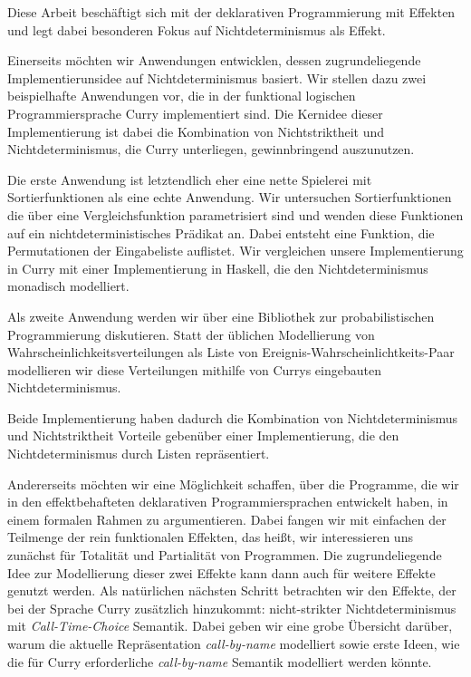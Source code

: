 Diese Arbeit besch\"aftigt sich mit der deklarativen
Programmierung mit Effekten und legt dabei besonderen Fokus auf
Nichtdeterminismus als Effekt.

Einerseits m\"ochten wir Anwendungen entwicklen, dessen
zugrundeliegende Implementierunsidee auf Nichtdeterminismus basiert.
Wir stellen dazu zwei beispielhafte Anwendungen vor, die in der
funktional logischen Programmiersprache Curry implementiert sind.
Die Kernidee dieser Implementierung ist dabei die Kombination von
Nichtstriktheit und Nichtdeterminismus, die Curry unterliegen,
gewinnbringend auszunutzen.

Die erste Anwendung ist letztendlich eher eine nette Spielerei mit
Sortierfunktionen als eine echte Anwendung.
Wir untersuchen Sortierfunktionen die \"uber eine Vergleichsfunktion
parametrisiert sind und wenden diese Funktionen auf ein
nichtdeterministisches Pr\"adikat an.
Dabei entsteht eine Funktion, die Permutationen der Eingabeliste
auflistet.
Wir vergleichen unsere Implementierung in Curry mit einer
Implementierung in Haskell, die den Nichtdeterminismus monadisch
modelliert.

Als zweite Anwendung werden wir \"uber eine Bibliothek zur
probabilistischen Programmierung diskutieren.
Statt der \"ublichen Modellierung von Wahrscheinlichkeitsverteilungen
als Liste von Ereignis-Wahrscheinlichtkeits-Paar modellieren wir diese
Verteilungen mithilfe von Currys eingebauten Nichtdeterminismus.

Beide Implementierung haben dadurch die Kombination von
Nichtdeterminismus und Nichtstriktheit Vorteile geben\"uber
einer Implementierung, die den Nichtdeterminismus durch Listen
repr\"asentiert.

Andererseits m\"ochten wir eine M\"oglichkeit schaffen, \"uber die
Programme, die wir in den effektbehafteten deklarativen
Programmiersprachen entwickelt haben, in einem formalen Rahmen zu
argumentieren.
Dabei fangen wir mit einfachen der Teilmenge der rein funktionalen
Effekten, das hei\ss{}t, wir interessieren uns zun\"achst f\"ur
Totalit\"at und Partialit\"at von Programmen.
Die zugrundeliegende Idee zur Modellierung dieser zwei Effekte kann
dann auch f\"ur weitere Effekte genutzt werden.
Als nat\"urlichen n\"achsten Schritt betrachten wir den Effekte, der
bei der Sprache Curry zus\"atzlich hinzukommt: nicht-strikter
Nichtdeterminismus mit \emph{Call-Time-Choice} Semantik.
Dabei geben wir eine grobe \"Ubersicht dar\"uber, warum die aktuelle
Repr\"asentation \emph{call-by-name} modelliert sowie erste Ideen, wie
die f\"ur Curry erforderliche \emph{call-by-name} Semantik modelliert
werden k\"onnte.

\endgroup